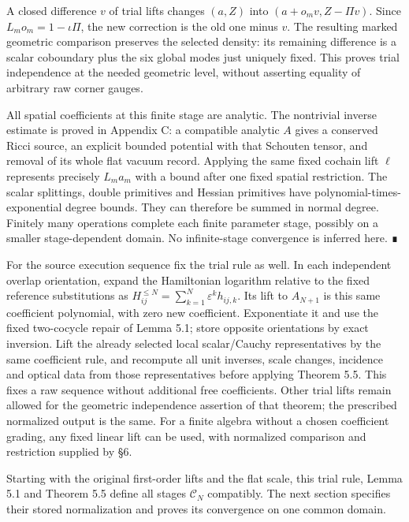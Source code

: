 \documentclass[
  english,
  11pt,
  reqno]{amsart}
\begin{document}
A closed difference \(v\) of trial lifts changes \((a,Z)\) into
\((a+o_mv,Z-\Pi v)\). Since \(L_mo_m=1-\iota\Pi\), the new correction is
the old one minus \(v\). The resulting marked geometric comparison
preserves the selected density: its remaining difference is a scalar
coboundary plus the six global modes just uniquely fixed. This proves
trial independence at the needed geometric level, without asserting
equality of arbitrary raw corner gauges.

All spatial coefficients at this finite stage are analytic. The
nontrivial inverse estimate is proved in Appendix C: a compatible
analytic \(A\) gives a conserved Ricci source, an explicit bounded
potential with that Schouten tensor, and removal of its whole flat
vacuum record. Applying the same fixed cochain lift \(\ell\) represents
precisely \(L_ma_m\) with a bound after one fixed spatial restriction.
The scalar splittings, double primitives and Hessian primitives have
polynomial-times-exponential degree bounds. They can therefore be summed
in normal degree. Finitely many operations complete each finite
parameter stage, possibly on a smaller stage-dependent domain. No
infinite-stage convergence is inferred here. ∎

For the source execution sequence fix the trial rule as well. In each
independent overlap orientation, expand the Hamiltonian logarithm
relative to the fixed reference substitutions as
\(H_{ij}^{\le N}=\sum_{k=1}^N\varepsilon^kh_{ij,k}\). Its lift to
\(A_{N+1}\) is this same coefficient polynomial, with zero new
coefficient. Exponentiate it and use the fixed two-cocycle repair of
Lemma 5.1; store opposite orientations by exact inversion. Lift the
already selected local scalar/Cauchy representatives by the same
coefficient rule, and recompute all unit inverses, scale changes,
incidence and optical data from those representatives before applying
Theorem 5.5. This fixes a raw sequence without additional free
coefficients. Other trial lifts remain allowed for the geometric
independence assertion of that theorem; the prescribed normalized output
is the same. For a finite algebra without a chosen coefficient grading,
any fixed linear lift can be used, with normalized comparison and
restriction supplied by §6.

Starting with the original first-order lifts and the flat scale, this
trial rule, Lemma 5.1 and Theorem 5.5 define all stages \(\mathcal C_N\)
compatibly. The next section specifies their stored normalization and
proves its convergence on one common domain.
\end{document}
